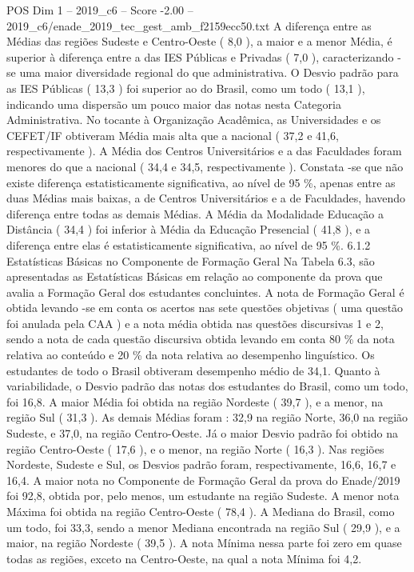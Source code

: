 \begin{textsample}{POS Dim 1 – 2019\_c6 – Score -2.00 – 2019\_c6/enade\_2019\_tec\_gest\_amb\_f2159ecc50.txt}
A diferença entre as Médias das regiões Sudeste e Centro-Oeste ( 8,0 ), a maior e a menor Média, é superior à diferença entre a das IES Públicas e Privadas ( 7,0 ), caracterizando -se uma maior diversidade regional do que administrativa.
O Desvio padrão para as IES Públicas ( 13,3 ) foi superior ao do Brasil, como um todo ( 13,1 ), indicando uma dispersão um pouco maior das notas nesta Categoria Administrativa.
No tocante à Organização Acadêmica, as Universidades e os CEFET/IF obtiveram Média mais alta que a nacional ( 37,2 e 41,6, respectivamente ).
A Média dos Centros Universitários e a das Faculdades foram menores do que a nacional ( 34,4 e 34,5, respectivamente ).
Constata -se que não existe diferença estatisticamente significativa, ao nível de 95 \%, apenas entre as duas Médias mais baixas, a de Centros Universitários e a de Faculdades, havendo diferença entre todas as demais Médias.
A Média da Modalidade Educação a Distância ( 34,4 ) foi inferior à Média da Educação Presencial ( 41,8 ), e a diferença entre elas é estatisticamente significativa, ao nível de 95 \%. 6.1.2 Estatísticas Básicas no Componente de Formação Geral Na Tabela 6.3, são apresentadas as Estatísticas Básicas em relação ao componente da prova que avalia a Formação Geral dos estudantes concluintes.
A nota de Formação Geral é obtida levando -se em conta os acertos nas sete questões objetivas ( uma questão foi anulada pela CAA ) e a nota média obtida nas questões discursivas 1 e 2, sendo a nota de cada questão discursiva obtida levando em conta 80 \% da nota relativa ao conteúdo e 20 \% da nota relativa ao desempenho linguístico.
Os estudantes de todo o Brasil obtiveram desempenho médio de 34,1.
Quanto à variabilidade, o Desvio padrão das notas dos estudantes do Brasil, como um todo, foi 16,8.
A maior Média foi obtida na região Nordeste ( 39,7 ), e a menor, na região Sul ( 31,3 ).
As demais Médias foram : 32,9 na região Norte, 36,0 na região Sudeste, e 37,0, na região Centro-Oeste.
Já o maior Desvio padrão foi obtido na região Centro-Oeste ( 17,6 ), e o menor, na região Norte ( 16,3 ).
Nas regiões Nordeste, Sudeste e Sul, os Desvios padrão foram, respectivamente, 16,6, 16,7 e 16,4.
A maior nota no Componente de Formação Geral da prova do Enade/2019 foi 92,8, obtida por, pelo menos, um estudante na região Sudeste.
A menor nota Máxima foi obtida na região Centro-Oeste ( 78,4 ).
A Mediana do Brasil, como um todo, foi 33,3, sendo a menor Mediana encontrada na região Sul ( 29,9 ), e a maior, na região Nordeste ( 39,5 ).
A nota Mínima nessa parte foi zero em quase todas as regiões, exceto na Centro-Oeste, na qual a nota Mínima foi 4,2.

\end{textsample}
